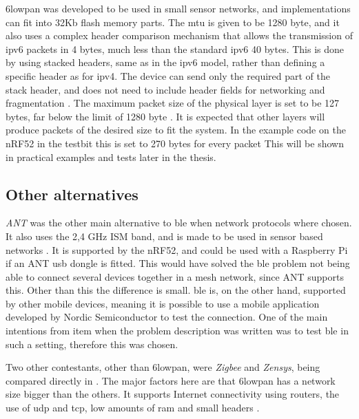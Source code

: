 \noindent \gls{6lowpan} was developed to be used in small sensor networks, and implementations can fit into 32Kb flash memory parts. The \gls{mtu} is given to be 1280 byte, and it also uses a complex header comparison mechanism that allows the transmission of \gls{ipv6} packets in 4 bytes, much less than the standard \gls{ipv6} 40 bytes. This is done by using stacked headers, same as in the \gls{ipv6} model, rather than defining a specific header as for \gls{ipv4}. The device can send only the required part of the stack header, and does not need to include header fields for networking and fragmentation \cite{hui2008extending}. The maximum packet size of the physical layer is set to be 127 bytes, far below the limit of 1280 byte \cite{kushalnagar2007transmission}. It is expected that other layers will produce packets of the desired size to fit the system. In the example code on the nRF52 in the testbit this is set to 270 bytes for every packet This will be shown in practical examples and tests later in the thesis. 

\subsection{Other alternatives}

\noindent \textit{ANT} was the other main alternative to \gls{ble} when network protocols where chosen. It also uses the 2,4 GHz ISM band, and is made to be used in sensor based networks . It is supported by the \gls{nRF52}, and could be used with a \gls{Raspberry Pi} if an ANT \gls{usb} dongle is fitted. This would have solved the \gls{ble} problem not being able to connect several devices together in a mesh network, since ANT supports this. Other than this the difference is small. \gls{ble} is, on the other hand, supported by other mobile devices, meaning it is possible to use a mobile application developed by Nordic Semiconductor to test the connection. One of the main intentions from \gls{item} when the problem description was written was to test \gls{ble} in such a setting, therefore this was chosen. 


\noindent Two other contestants, other than \gls{6lowpan}, were \textit{Zigbee} and \textit{Zensys}, being compared directly in \cite{mulligan20076lowpan}. The major factors here are that \gls{6lowpan} has a network size bigger than the others. It supports Internet connectivity using routers, the use of \gls{udp} and \gls{tcp}, low amounts of \gls{ram} and small headers \cite{mulligan20076lowpan}. 

